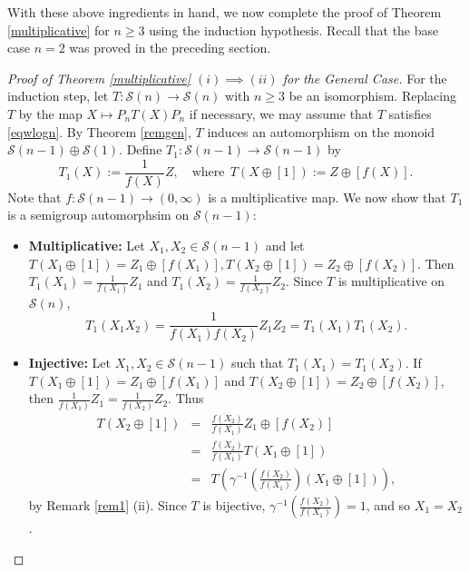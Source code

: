 \documentclass[11pt,reqno]{amsart}
\theoremstyle{plain}
\theoremstyle{definition}
\numberwithin{equation}{section}
\def\cS{\mathcal S}
\begin{document}
With these above ingredients in hand, we now complete the proof of Theorem \ref{multiplicative} for $n\geq 3$ using the induction hypothesis. Recall that the base case $n=2$ was proved in the preceding section. 
\begin{proof}[Proof of Theorem \ref{multiplicative} $(i)\implies (ii)$ for the General Case]
For the induction step, let $T:\cS(n) \to \cS(n)$ with $n\geq 3$ be an isomorphism. Replacing $T$ by the map $X \mapsto P_n T(X) P_n$ if necessary, we may assume that $T$ satisfies \eqref{eqwlogn}. By Theorem \ref{remgen}, $T$ induces an automorphism on the  monoid $\cS(n-1) \oplus \cS(1)$. Define $T_1: \cS(n-1) \rightarrow \cS(n-1)$ by
	\begin{equation}\label{pnceq001}
T_1(X) := \frac{1}{f(X)}Z,\quad \text{where} ~~T(X\oplus [1]):= Z \oplus [f(X)]. \end{equation}
	Note that $f:\cS(n-1)\to (0,\infty)$ is a multiplicative map. We now show that $T_1$ is a semigroup automorphsim on $\cS(n-1)$:
	\begin{itemize}
		\item \textbf{Multiplicative:} Let $X_1,X_2 \in  \cS(n-1)$ and let $T(X_1\oplus [1])= Z_1 \oplus [f({X_1})], T(X_2\oplus [1])= Z_2 \oplus [f({X_2})]$. Then $T_1(X_1)=\frac{1}{f({X_1})}Z_1$ and $T_1(X_2)=\frac{1}{f({X_2})}Z_2$. Since $T$ is multiplicative on $\cS (n)$, 
		\[T_1(X_1 X_2)= \frac{1}{f({X_1})f({X_2})}Z_1 Z_2= T_1(X_1) T_1 (X_2).\]
		
		\item \textbf{Injective:} Let $X_1,X_2 \in  \cS(n-1)$ such that $T_1(X_1)=T_1(X_2)$. If $T(X_1\oplus [1])= Z_1 \oplus [f({X_1})]$ and $ T(X_2\oplus [1])= Z_2 \oplus [f({X_2})]$, then $\frac{1}{f({X_1})}Z_1=\frac{1}{f({X_2})}Z_2$. Thus
		\begin{eqnarray*} %
			T(X_2\oplus [1])&=&\frac{f({X_2})}{f({X_1})}Z_1 \oplus [f({X_2})] \\\nonumber
			&=& \frac{f({X_2})}{f({X_1})}T(X_1 \oplus [1])\\ \nonumber
			&=&T\left(\gamma^{-1}\left(\frac{f({X_2})}{f({X_1})}\right)(X_1 \oplus [1])\right),
		\end{eqnarray*}
 by Remark \ref{rem1} (ii). Since $T$ is bijective,  $\gamma^{-1}\left(\frac{f({X_2})}{f({X_1})}\right)=1$, and so $X_1=X_2$.
		

\end{itemize}
\end{proof}
\end{document}
